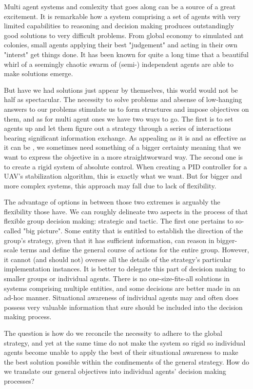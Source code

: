 Multi agent systems and comlexity that goes along can be a source of a great excitement.
It is remarkable how a system comprising a set of agents with very limited capabilities to reasoning and decision making produces outstandingly good solutions to very difficult problems.
From global economy to simulated ant colonies, small agents applying their best "judgement" and acting in their own "interst" get things done.
It has been known for quite a long time that a beautiful whirl of a seemingly chaotic swarm of (semi-) independent agents are able to make solutions emerge.

But have we had solutions just appear by themselves, this world would not be half as spectacular.
The necessity to solve problems and absense of low-hanging answers to our problems stimulate us to form structures and impose objectives on them, and as for multi agent ones we have two ways to go.
The first is to set agents up and let them figure out a strategy through a series of interactions bearing significant information exchange.
As appealing as it is and as effective as it can be \cite{dorigo-2006}, we sometimes need something of a bigger certainty meaning that we want to express the objective in a more straightworward way.
The second one is to create a rigid system of absolute control.
When creating a PID controller for a UAV's stabilization algorithm, this is exactly what we want.
But for bigger and more complex systems, this approach may fall due to lack of flexibility.

The advantage of options in between those two extremes is arguably the flexibility those have. We can roughly delineate two
aspects in the process of that flexible group decision making: strategic and tactic. The first one pertains to
so-called "big picture". Some entity that is entitled to establish the direction of the group's strategy, given that it
has sufficient information, can reason in bigger-scale terms and define the general course of actions for the entire
group. However, it cannot (and should not) oversee all the details of the strategy's particular implementation
instances. It is better to delegate this part of decision making to smaller groups or individual agents. There is no
one-size-fits-all solutions in systems comprising multiple entities, and some decisions are better made in an ad-hoc
manner.
Situational awareness \cite{endsley-1995} of individual agents may and often does possess very valuable information that
sure should be included into the decision making process.

The question is how do we reconcile the necessity to adhere to the global strategy, and yet at the same time do not make
the system so rigid so individual agents become unable to apply the best of their situational awareness to make the best
solution possible within the confinements of the general strategy. How do we translate our general objectives into
individual agents' decision making processes?

